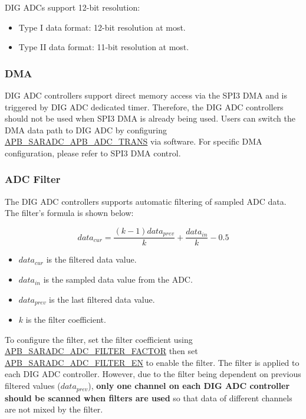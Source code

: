 \documentclass[main\_\_EN.tex]{subfiles}
\begin{document}
DIG ADCs support 12-bit resolution:
\begin{itemize}
    \item Type I data format: 12-bit resolution at most.
    \item Type II data format: 11-bit resolution at most.
\end{itemize}

\subsubsection{DMA}

DIG ADC controllers support direct memory access via the SPI3 DMA and is triggered by DIG ADC dedicated timer. Therefore, the DIG ADC controllers should not be used when SPI3 DMA is already being used. Users can switch the DMA data path to DIG ADC by configuring \hyperref[fielddesc:APBSARADCAPBADCTRANS]{APB\_SARADC\_APB\_ADC\_TRANS} via software. For specific DMA configuration, please refer to SPI3 DMA control.

\subsubsection{ADC Filter}

The DIG ADC controllers supports automatic filtering of sampled ADC data. The filter's formula is shown below:

\[data_{cur} = \frac{(k-1)data_{prev}}{k}+\frac{data_{in}}{k}-0.5\]

\begin{itemize}
    \item \(data_{cur}\) is the filtered data value.
    \item \(data_{in}\) is the sampled data value from the ADC.
    \item \(data_{prev}\) is the last filtered data value.
    \item \(k\) is the filter coefficient.
\end{itemize}

To configure the filter, set the filter coefficient using \hyperref[fielddesc:APBSARADCADC1FILTERFACTOR]{APB\_SARADC\_ADC\_FILTER\_FACTOR} then set \hyperref[fielddesc:APBSARADCADC1FILTEREN]{APB\_SARADC\_ADC\_FILTER\_EN} to enable the filter. The filter is applied to each DIG ADC controller. However, due to the filter being dependent on previous filtered values (\(data_{prev}\)), \textbf{only one channel on each DIG ADC controller should be scanned when filters are used} so that data of different channels are not mixed by the filter.
\end{document}
